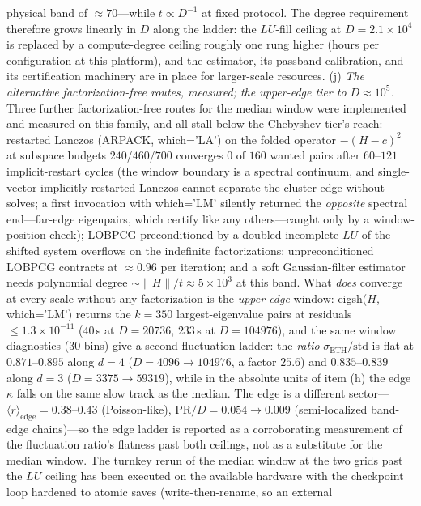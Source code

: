 \begin{remark}
physical band of $\approx70$---while $t\propto D^{-1}$ at fixed protocol. The degree
requirement therefore grows linearly in $D$ along the ladder: the $LU$-fill ceiling at
$D=2.1\times10^{4}$ is replaced by a compute-degree ceiling roughly one rung higher
(hours per configuration at this platform), and the estimator, its passband calibration,
and its certification machinery are in place for larger-scale resources.
(j) \emph{The alternative factorization-free routes, measured; the upper-edge
tier to $D\approx10^{5}$.} Three further factorization-free routes for the
median window were implemented and measured on this family, and all stall
below the Chebyshev tier's reach: restarted Lanczos (ARPACK, which='LA') on
the folded operator $-(H-c)^{2}$ at subspace budgets $240$/$460$/$700$
converges $0$ of $160$ wanted pairs after $60$--$121$ implicit-restart cycles
(the window boundary is a spectral continuum, and single-vector implicitly
restarted Lanczos cannot separate the cluster edge without solves; a first
invocation with which='LM' silently returned the \emph{opposite} spectral
end---far-edge eigenpairs, which certify like any others---caught only by a
window-position check); LOBPCG preconditioned by a doubled incomplete $LU$ of
the shifted system overflows on the indefinite factorizations; unpreconditioned
LOBPCG contracts at $\approx0.96$ per iteration; and a soft Gaussian-filter
estimator needs polynomial degree $\sim\|H\|/t\approx5\times10^{3}$ at this
band. What \emph{does} converge at every scale without any factorization is the
\emph{upper-edge} window: eigsh($H$, which='LM') returns the $k=350$
largest-eigenvalue pairs at residuals $\leq1.3\times10^{-11}$
($40$\,s at $D=20736$, $233$\,s at $D=104976$), and the same
window diagnostics (30 bins) give a second fluctuation ladder: the
\emph{ratio} $\sigma_{\mathrm{ETH}}/\mathrm{std}$ is flat at
$0.871$--$0.895$ along $d=4$ ($D=4096\to104976$, a factor $25.6$) and
$0.835$--$0.839$ along $d=3$ ($D=3375\to59319$), while in the absolute units
of item (h) the edge $\kappa$ falls on the same slow track as the median. The
edge is a different sector---$\langle r\rangle_{\mathrm{edge}}=0.38$--$0.43$
(Poisson-like), $\mathrm{PR}/D=0.054\to0.009$ (semi-localized band-edge
chains)---so the edge ladder is reported as a corroborating measurement of the
fluctuation ratio's flatness past both ceilings, not as a substitute for the
median window. The turnkey rerun of the median window at the two grids past
the $LU$ ceiling has been executed on the available hardware with the
checkpoint loop hardened to atomic saves (write-then-rename, so an external

\end{remark}
